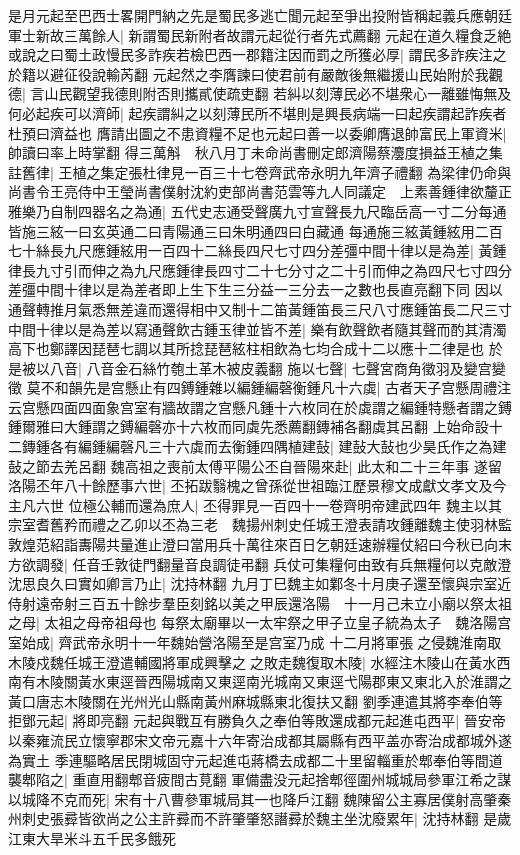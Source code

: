 是月元起至巴西士畧開門納之先是蜀民多逃亡聞元起至爭出投附皆稱起義兵應朝廷軍士新故三萬餘人|{
	新謂蜀民新附者故謂元起從行者先式薦翻}
元起在道久糧食乏絶或說之曰蜀土政慢民多詐疾若檢巴西一郡籍注因而罰之所獲必厚|{
	謂民多詐疾注之於籍以避征役說輸芮翻}
元起然之李膺諫曰使君前有嚴敵後無繼援山民始附於我觀德|{
	言山民觀望我德則附否則攜貳使疏吏翻}
若糾以刻薄民必不堪衆心一離雖悔無及何必起疾可以濟師|{
	起疾謂糾之以刻薄民所不堪則是興長病端一曰起疾謂起詐疾者杜預曰濟益也}
膺請出圖之不患資糧不足也元起曰善一以委卿膺退帥富民上軍資米|{
	帥讀曰率上時掌翻}
得三萬斛　秋八月丁未命尚書刪定郎濟陽蔡灋度損益王植之集註舊律|{
	王植之集定張杜律見一百三十七卷齊武帝永明九年濟子禮翻}
為梁律仍命與尚書令王亮侍中王瑩尚書僕射沈約吏部尚書范雲等九人同議定　上素善鍾律欲釐正雅樂乃自制四器名之為通|{
	五代史志通受聲廣九寸宣聲長九尺臨岳高一寸二分每通皆施三絃一曰玄英通二曰青陽通三曰朱明通四曰白藏通}
每通施三絃黃鍾絃用二百七十絲長九尺應鍾絃用一百四十二絲長四尺七寸四分差彊中間十律以是為差|{
	黃鍾律長九寸引而伸之為九尺應鍾律長四寸二十七分寸之二十引而伸之為四尺七寸四分差彊中間十律以是為差者即上生下生三分益一三分去一之數也長直亮翻下同}
因以通聲轉推月氣悉無差違而還得相中又制十二笛黃鍾笛長三尺八寸應鍾笛長二尺三寸中間十律以是為差以寫通聲飲古鍾玉律並皆不差|{
	樂有飲聲飲者隨其聲而酌其清濁高下也鄭譯因琵琶七調以其所捻琵琶絃柱相飲為七均合成十二以應十二律是也}
於是被以八音|{
	八音金石絲竹匏土革木被皮義翻}
施以七聲|{
	七聲宮商角徵羽及變宫變徵}
莫不和韻先是宫懸止有四鎛鍾雜以編鍾編磬衡鍾凡十六虡|{
	古者天子宫懸周禮注云宫懸四面四面象宫室有牆故謂之宫懸凡鍾十六枚同在於虡謂之編鍾特懸者謂之鎛鍾爾雅曰大鍾謂之鎛編磬亦十六枚而同虡先悉薦翻鏄補各翻虡其呂翻}
上始命設十二鏄鍾各有編鍾編磬凡三十六虡而去衡鍾四隅植建鼔|{
	建鼔大鼔也少昊氏作之為建鼔之節去羌呂翻}
魏高祖之喪前太傅平陽公丕自晉陽來赴|{
	此太和二十三年事}
遂留洛陽丕年八十餘歷事六世|{
	丕拓跋翳槐之曾孫從世祖臨江歷景穆文成獻文孝文及今主凡六世}
位極公輔而還為庶人|{
	丕得罪見一百四十一卷齊明帝建武四年}
魏主以其宗室耆舊矜而禮之乙卯以丕為三老　魏揚州刺史任城王澄表請攻鍾離魏主使羽林監敦煌范紹詣夀陽共量進止澄曰當用兵十萬往來百日乞朝廷速辦糧仗紹曰今秋已向末方欲調發|{
	任音壬敦徒門翻量音良調徒弔翻}
兵仗可集糧何由致有兵無糧何以克敵澄沈思良久曰實如卿言乃止|{
	沈持林翻}
九月丁巳魏主如鄴冬十月庚子還至懷與宗室近侍射遠帝射三百五十餘步羣臣刻銘以美之甲辰還洛陽　十一月己未立小廟以祭太祖之母|{
	太祖之母帝祖母也}
每祭太廟畢以一太牢祭之甲子立皇子統為太子　魏洛陽宫室始成|{
	齊武帝永明十一年魏始營洛陽至是宫室乃成}
十二月將軍張之侵魏淮南取木陵戍魏任城王澄遣輔國將軍成興擊之之敗走魏復取木陵|{
	水經注木陵山在黃水西南有木陵關黃水東逕晉西陽城南又東逕南光城南又東逕弋陽郡東又東北入於淮謂之黃口唐志木陵關在光州光山縣南黃州麻城縣東北復扶又翻}
劉季連遣其將李奉伯等拒鄧元起|{
	將即亮翻}
元起與戰互有勝負久之奉伯等敗還成都元起進屯西平|{
	晉安帝以秦雍流民立懷寧郡宋文帝元嘉十六年寄治成都其屬縣有西平盖亦寄治成都城外遂為實土}
季連驅略居民閉城固守元起進屯蔣橋去成都二十里留輜重於郫奉伯等間道襲郫陷之|{
	重直用翻郫音疲間古莧翻}
軍備盡没元起捨郫徑圍州城城局參軍江希之謀以城降不克而死|{
	宋有十八曹參軍城局其一也降戶江翻}
魏陳留公主寡居僕射高肇秦州刺史張彛皆欲尚之公主許彛而不許肇肇怒譖彛於魏主坐沈廢累年|{
	沈持林翻}
是歲江東大旱米斗五千民多餓死

